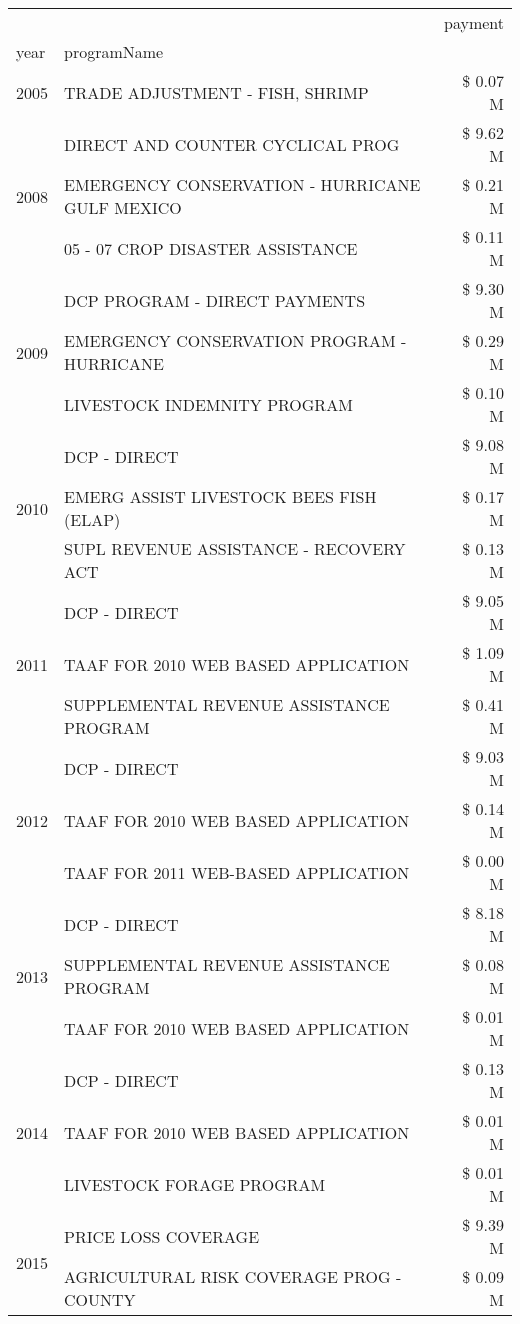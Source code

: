 \begin{tabular}{llr}
\toprule
 &  & payment \\
year & programName &  \\
\midrule
2005 & TRADE ADJUSTMENT - FISH, SHRIMP & \$ 0.07 M \\
\cline{1-3}
\multirow[t]{3}{*}{2008} & DIRECT AND COUNTER CYCLICAL PROG & \$ 9.62 M \\
 & EMERGENCY CONSERVATION - HURRICANE GULF MEXICO & \$ 0.21 M \\
 & 05 - 07 CROP DISASTER ASSISTANCE & \$ 0.11 M \\
\cline{1-3}
\multirow[t]{3}{*}{2009} & DCP PROGRAM - DIRECT PAYMENTS & \$ 9.30 M \\
 & EMERGENCY CONSERVATION PROGRAM - HURRICANE & \$ 0.29 M \\
 & LIVESTOCK INDEMNITY PROGRAM & \$ 0.10 M \\
\cline{1-3}
\multirow[t]{3}{*}{2010} & DCP - DIRECT & \$ 9.08 M \\
 & EMERG ASSIST LIVESTOCK BEES FISH (ELAP) & \$ 0.17 M \\
 & SUPL REVENUE ASSISTANCE - RECOVERY ACT & \$ 0.13 M \\
\cline{1-3}
\multirow[t]{3}{*}{2011} & DCP - DIRECT & \$ 9.05 M \\
 & TAAF FOR 2010 WEB BASED APPLICATION & \$ 1.09 M \\
 & SUPPLEMENTAL REVENUE ASSISTANCE PROGRAM & \$ 0.41 M \\
\cline{1-3}
\multirow[t]{3}{*}{2012} & DCP - DIRECT & \$ 9.03 M \\
 & TAAF FOR 2010 WEB BASED APPLICATION & \$ 0.14 M \\
 & TAAF FOR 2011 WEB-BASED APPLICATION & \$ 0.00 M \\
\cline{1-3}
\multirow[t]{3}{*}{2013} & DCP - DIRECT & \$ 8.18 M \\
 & SUPPLEMENTAL REVENUE ASSISTANCE PROGRAM & \$ 0.08 M \\
 & TAAF FOR 2010 WEB BASED APPLICATION & \$ 0.01 M \\
\cline{1-3}
\multirow[t]{3}{*}{2014} & DCP - DIRECT & \$ 0.13 M \\
 & TAAF FOR 2010 WEB BASED APPLICATION & \$ 0.01 M \\
 & LIVESTOCK FORAGE PROGRAM & \$ 0.01 M \\
\cline{1-3}
\multirow[t]{3}{*}{2015} & PRICE LOSS COVERAGE & \$ 9.39 M \\
 & AGRICULTURAL RISK COVERAGE PROG - COUNTY & \$ 0.09 M \\

\end{tabular}
